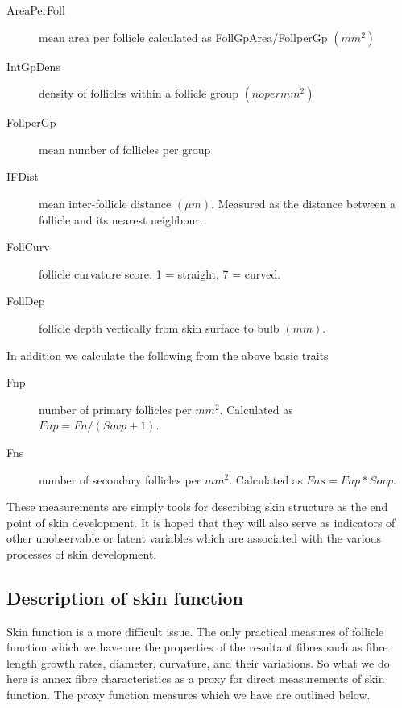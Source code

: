 \documentclass[titlepage]{article}  %
\begin{document}
\begin{description}
\item[AreaPerFoll] mean area per follicle calculated as FollGpArea/FollperGp $(mm^2)$
\item[IntGpDens] density of follicles within a follicle group $(no per mm^2)$
\item[FollperGp] mean number of follicles per group
\item[IFDist] mean inter-follicle distance $(\mu m)$. Measured as the distance between a follicle and its nearest neighbour.
\item[FollCurv] follicle curvature score. 1 = straight, 7 = curved.
\item[FollDep] follicle depth vertically from skin surface to bulb $(mm)$.
\end{description}
 In addition we calculate the following from the above basic traits
\begin{description}
\item[Fnp] number of primary follicles per $mm^2$. Calculated as $Fnp = Fn/(Sovp + 1)$.
\item[Fns] number of secondary follicles per $mm^2$. Calculated as $Fns = Fnp * Sovp$.
\end{description}
These measurements are simply tools for describing skin structure as the end point of skin development. It is hoped that they will also serve as indicators of other unobservable or latent variables which are associated with the various processes of skin development.

\subsection{Description of skin function}
\label{sec:skinfunc}
Skin function is a more difficult issue. The only practical measures of follicle function which we have are the properties of the resultant fibres such as fibre length growth rates, diameter, curvature, and their variations.  So what we do here is annex fibre characteristics as a proxy for direct measurements of skin function. The proxy function measures which we have are outlined below.
\end{document}
